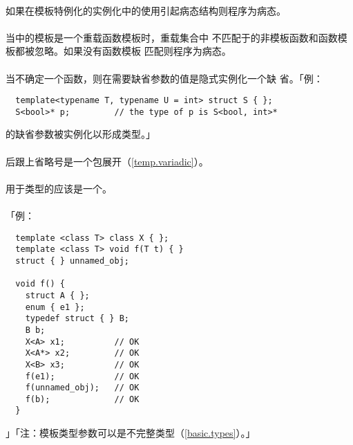 \paragraph{}
如果在模板特例化的实例化中的使用引起病态结构则程序为病态。

\paragraph{}
当中的模板是一个重载函数模板时，重载集合中
不匹配于的非模板函数和函数模板都被忽略。如果没有函数模板
匹配则程序为病态。

\paragraph{}
当不确定一个函数，则在需要缺省参数的值是隐式实例化一个缺
省。「例：
\begin{lstlisting}
  template<typename T, typename U = int> struct S { };
  S<bool>* p;         // the type of p is S<bool, int>*
\end{lstlisting}
的缺省参数被实例化以形成类型。」

\paragraph{}
后跟上省略号是一个包展开（\ref{temp.variadic}）。

\paragraph{}
用于类型的应该是一个。

\paragraph{}
「例：
\begin{lstlisting}
  template <class T> class X { };
  template <class T> void f(T t) { }
  struct { } unnamed_obj;

  void f() {
    struct A { };
    enum { e1 };
    typedef struct { } B;
    B b;
    X<A> x1;          // OK
    X<A*> x2;         // OK
    X<B> x3;          // OK
    f(e1);            // OK
    f(unnamed_obj);   // OK
    f(b);             // OK
  }
\end{lstlisting}」「注：模板类型参数可以是不完整类型（\ref{basic.types}）。」


